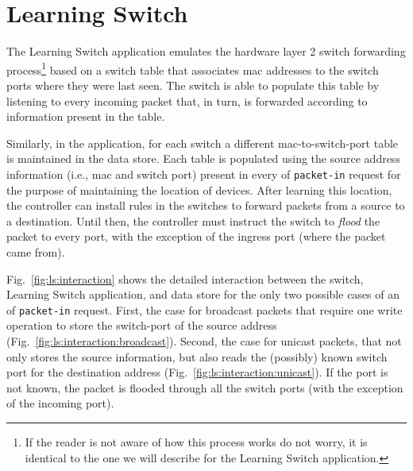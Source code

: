 \section{Learning Switch} 
\label{sec:feasibility:ls}
\glsresetall

The Learning Switch application emulates the hardware layer 2 switch forwarding process\footnote{If the reader is not aware of how this process works do not worry, it is identical to the one we will describe for the Learning Switch application.} based on a switch table that associates \gls{mac} addresses to the switch ports where they were last seen. 
The switch is able to populate this table by listening to every incoming packet that, in turn, is forwarded according to information present in the table. 

Similarly, in the application, for each switch a different \gls{mac}-to-switch-port table is maintained in the data store. 
Each table is populated using the source address information (i.e., \gls{mac} and switch port)  present in every \gls{of}  \texttt{packet-in} request for the purpose of maintaining the location of devices. 
After learning this location, the controller can install rules in the switches to forward packets from a source to  a destination. 
Until then, the controller must instruct the switch to \emph{flood} the packet to every port, with the exception of the ingress port (where the packet came from).


Fig.~\ref{fig:ls:interaction}  shows the detailed interaction between the switch, Learning Switch application, and data store for the only two possible cases of an \gls{of} \texttt{packet-in} request. 
First, the case for broadcast packets that require one write operation to store the switch-port  of the source address (Fig.~\ref{fig:ls:interaction:broadcast}). 
Second,  the case for unicast packets, that not only stores the source information, but also reads the (possibly) known switch port for the destination address (Fig.~\ref{fig:ls:interaction:unicast}). 
If the port is not known, the packet is flooded through all the switch ports (with the exception of the incoming port). 

